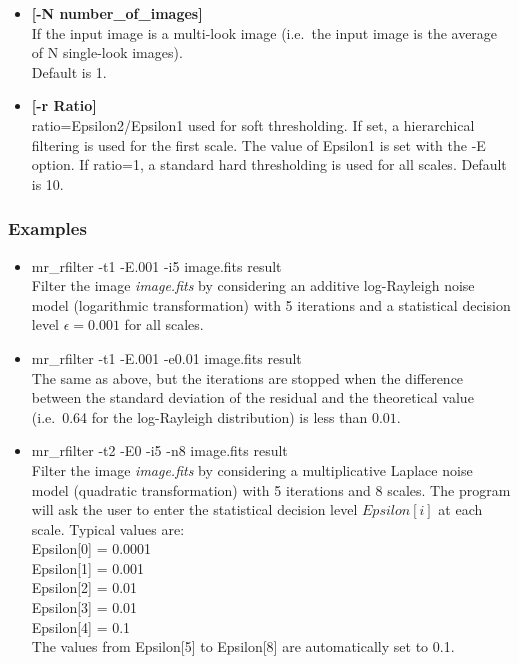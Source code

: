 \begin{itemize}
\begin{itemize}
\item {\bf [-N number\_of\_images]} \\
If the input image is a multi-look image (i.e.\ the input image  
is the average of N single-look images).\\
Default is 1.

\item {\bf [-r Ratio]} \\
ratio=Epsilon2/Epsilon1 used for soft thresholding. If set, a hierarchical filtering is used for the first scale. The value of Epsilon1 is set with the -E option. If ratio=1, a standard hard thresholding is used for all scales.
Default is 10.
\end{itemize}

\subsubsection*{Examples}
\begin{itemize}
\baselineskip=0.4truecm
\item mr\_rfilter -t1 -E.001 -i5  image.fits result\\
Filter the image {\it image.fits} by considering an additive log-Rayleigh 
noise model (logarithmic transformation) with 5 iterations and a 
statistical decision level $\epsilon=0.001$ for all scales. 

\item mr\_rfilter -t1 -E.001 -e0.01 image.fits result\\
The same as above, but the iterations are stopped when the difference between the standard deviation of the residual and the theoretical value 
(i.e.\ 0.64 for the log-Rayleigh distribution) is less than $0.01$. 

\item mr\_rfilter -t2 -E0 -i5 -n8 image.fits result\\
Filter the image {\it image.fits} by considering a multiplicative Laplace  noise model (quadratic transformation) with 5 iterations and 8 scales. The program will ask the user to enter the statistical decision level $Epsilon[i]$ at each scale. Typical values are:\\
Epsilon[0] = 0.0001\\
Epsilon[1] = 0.001\\
Epsilon[2] = 0.01\\
Epsilon[3] = 0.01\\
Epsilon[4] = 0.1\\
The values from Epsilon[5] to Epsilon[8] are automatically set to  0.1.



\end{itemize}
\end{itemize}
